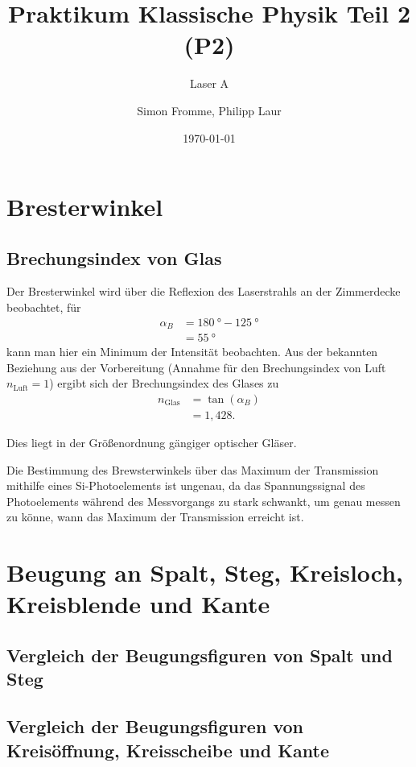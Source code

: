 \documentclass[ngerman, parskip*]{scrartcl}
\title{Praktikum Klassische Physik Teil 2 (P2)}
\subtitle{Laser A}
\author{Simon Fromme, Philipp Laur}
\date{\today}
\begin{document}
\maketitle
\tableofcontents
\newpage

\section{Bresterwinkel}

\subsection{Brechungsindex von Glas}

Der Bresterwinkel wird über die Reflexion des Laserstrahls an der Zimmerdecke beobachtet, für 
\begin{align*}
  \alpha_B &=  \SI{180}{\degree} - \SI{125}{\degree} \\
  &=  \SI{55}{\degree}
\end{align*} 
kann man hier ein Minimum der Intensität beobachten. Aus der bekannten Beziehung aus der Vorbereitung (Annahme für den Brechungsindex von Luft $n_{\textrm{Luft}} = 1$) ergibt sich der Brechungsindex des Glases zu
\begin{align*}
  n_{\textrm{Glas}} &= \tan(\alpha_B) \\
  &= 1,428.
\end{align*}

Dies liegt in der Größenordnung gängiger optischer Gläser.

Die Bestimmung des Brewsterwinkels über das Maximum der Transmission mithilfe eines Si-Photoelements ist ungenau, da das Spannungssignal des Photoelements während des Messvorgangs zu stark schwankt, um genau messen zu könne, wann das Maximum der Transmission erreicht ist.


\section{Beugung an Spalt, Steg, Kreisloch, Kreisblende und Kante}

\subsection{Vergleich der Beugungsfiguren von Spalt und Steg}


\subsection{Vergleich der Beugungsfiguren von Kreisöffnung, Kreisscheibe und Kante }
\end{document}
